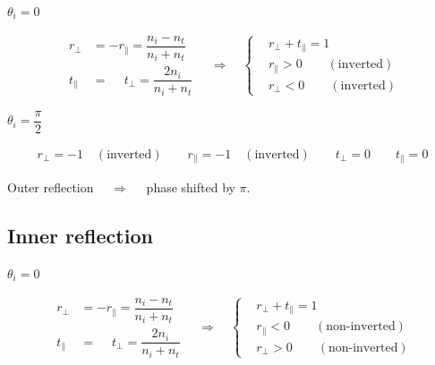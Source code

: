 $\theta_i = 0$

\begin{equation*}
  \begin{aligned}
    r_{\perp} &= - r_{\parallel} = \dfrac{n_i - n_t}{n_i + n_t} \\
    t_{\parallel} &= \phantom{+} t_{\perp} = \dfrac{2 n_i}{n_i + n_t} 
  \end{aligned}
  \quad \Rightarrow \quad 
  \left\{
  \begin{aligned}
    & r_{\perp} + t_{\parallel} = 1 \\
    & r_{\parallel} > 0 \quad\quad \left( \text{inverted} \right) \\
    & r_{\perp} < 0 \quad\quad \left( \text{inverted} \right)
  \end{aligned}
  \right.
\end{equation*}

$\theta_i = \dfrac{\pi}{2} $

\begin{equation*}
  \begin{aligned}
    r_{\perp} = -1 \quad \left( \text{inverted} \right) \quad\quad r_{\parallel} = -1 \quad \left( \text{inverted} \right) \quad\quad t_{\perp} = 0 \quad\quad t_{\parallel} = 0
  \end{aligned}
\end{equation*}

Outer reflection $\quad \Rightarrow \quad $ phase shifted by $\pi$.

\subsection{Inner reflection}

$\theta_i = 0$

\begin{equation*}
  \begin{aligned}
    r_{\perp} &= - r_{\parallel} = \dfrac{n_i - n_t}{n_i + n_t} \\
    t_{\parallel} &= \phantom{+} t_{\perp} = \dfrac{2 n_i}{n_i + n_t} 
  \end{aligned}
  \quad \Rightarrow \quad 
  \left\{
  \begin{aligned}
    & r_{\perp} + t_{\parallel} = 1 \\
    & r_{\parallel} < 0 \quad\quad \left( \text{non-inverted} \right) \\
    & r_{\perp} > 0 \quad\quad \left( \text{non-inverted} \right)
  \end{aligned}
  \right.
\end{equation*}

